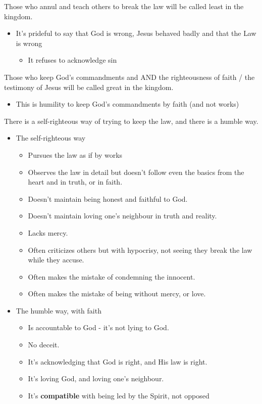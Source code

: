 \documentclass[11pt]{article}
\begin{document}
Those who annul and teach others to break the law will be called least in the kingdom.
\begin{itemize}
\item It's prideful to say that God is wrong, Jesus behaved badly and that the Law is wrong
\begin{itemize}
\item It refuses to acknowledge sin
\end{itemize}
\end{itemize}
Those who keep God's commandments and AND the righteousness of faith / the testimony of Jesus will be called great in the kingdom.
\begin{itemize}
\item This is humility to keep God's commandments by faith (and not works)
\end{itemize}

There is a self-righteous way of trying to keep the law, and there is a humble way.
\begin{itemize}
\item The self-righteous way
\begin{itemize}
\item Pursues the law as if by works
\item Observes the law in detail but doesn't follow even the basics from the heart and in truth, or in faith.
\item Doesn't maintain being honest and faithful to God.
\item Doesn't maintain loving one's neighbour in truth and reality.
\item Lacks mercy.
\item Often criticizes others but with hypocrisy, not seeing they break the law while they accuse.
\item Often makes the mistake of condemning the innocent.
\item Often makes the mistake of being without mercy, or love.
\end{itemize}
\item The humble way, with faith
\begin{itemize}
\item Is accountable to God - it's not lying to God.
\item No deceit.
\item It's acknowledging that God is right, and His law is right.
\item It's loving God, and loving one's neighbour.
\item It's \textbf{compatible} with being led by the Spirit, not opposed
\end{itemize}
\end{itemize}
\end{document}
